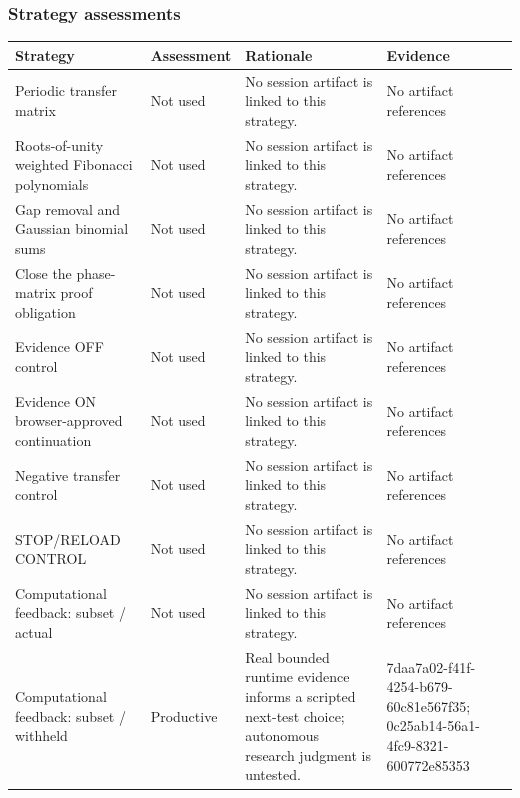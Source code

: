 \documentclass[11pt]{article}
\begin{document}
\subsubsection*{Strategy assessments}
\begin{longtable}{>{\raggedright\arraybackslash}p{.16\linewidth}>{\raggedright\arraybackslash}p{.15\linewidth}>{\raggedright\arraybackslash}p{.40\linewidth}>{\raggedright\arraybackslash}p{.17\linewidth}}
\toprule Strategy & Assessment & Rationale & Evidence \\
\midrule\endhead
Periodic transfer matrix & Not used & No session artifact is linked to this strategy. & No artifact references \\
Roots-of-unity weighted Fibonacci polynomials & Not used & No session artifact is linked to this strategy. & No artifact references \\
Gap removal and Gaussian binomial sums & Not used & No session artifact is linked to this strategy. & No artifact references \\
Close the phase-matrix proof obligation & Not used & No session artifact is linked to this strategy. & No artifact references \\
Evidence OFF control & Not used & No session artifact is linked to this strategy. & No artifact references \\
Evidence ON browser-approved continuation & Not used & No session artifact is linked to this strategy. & No artifact references \\
Negative transfer control & Not used & No session artifact is linked to this strategy. & No artifact references \\
STOP/RELOAD CONTROL & Not used & No session artifact is linked to this strategy. & No artifact references \\
Computational feedback: subset / actual & Not used & No session artifact is linked to this strategy. & No artifact references \\
Computational feedback: subset / withheld & Productive & Real bounded runtime evidence informs a scripted next-test choice; autonomous research judgment is untested. & 7daa7a02-f41f-4254-b679-60c81e567f35; 0c25ab14-56a1-4fc9-8321-600772e85353 \\
\bottomrule
\end{longtable}
\end{document}
